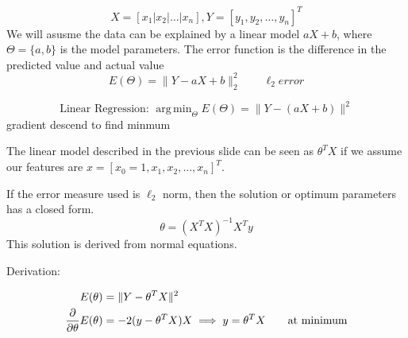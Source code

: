 \begin{slide}
	$$X=[x_1|x_2|\ldots|x_n], Y=[y_1,y_2,\ldots,y_n]^T$$
	We will asusme the data can be explained by a linear model $aX+b$, where $\Theta=\{a,b\}$ is the model parameters.
	The error function is the difference in the predicted value and actual value 
	$$E(\Theta) =\|Y - aX+b\|_2^2 \qquad \ell_2error$$

	\begin{shaded}
		$$ \text{Linear Regression: } \mathop{\mathrm{arg\,min}}_{\Theta}E(\Theta) =  \|Y - (aX+b)\|^2$$
		\hfill {\tiny gradient descend to find minmum}
	\end{shaded}
\end{slide}
\begin{slide}
The linear model described in the previous slide can be seen as $\theta^TX$ if we assume our features are $x = [x_0=1,x_1,x_2,\ldots,x_n]^T$. 

If the error measure used is $\ell_2$ norm, then the solution or optimum parameters has a closed form.
$$\theta  = (X^TX)^{-1}X^Ty$$
This solution is derived from normal equations.

Derivation:

\begin{align*}
	E(\theta) &= \|Y - \theta^TX\|^2\\
	{\partial \over \partial \theta}E(\theta) &= -2(y-\theta^TX)X \implies
	y = \theta^TX \qquad\text{at minimum}
\end{align*}
\end{slide}
